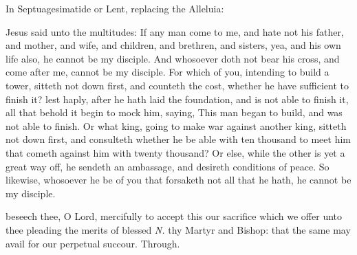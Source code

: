 
\begin{rubric}
{In Septuagesimatide or Lent, replacing the Alleluia:}
\end{rubric}

\vspace{-1ex}


 Jesus said unto the multitudes:  If any man come to me, and hate not his father, and mother, and wife, and children, and brethren, and sisters, yea, and his own life also, he cannot be my disciple. And whosoever doth not bear his cross, and come after me, cannot be my disciple. For which of you, intending to build a tower, sitteth not down first, and counteth the cost, whether he have sufficient to finish it? lest haply, after he hath laid the foundation, and is not able to finish it, all that behold it begin to mock him, saying, This man began to build, and was not able to finish. Or what king, going to make war against another king, sitteth not down first, and consulteth whether he be able with ten thousand to meet him that cometh against him with twenty thousand? Or else, while the other is yet a great way off, he sendeth an ambassage, and desireth conditions of peace. So likewise, whosoever he be of you that forsaketh not all that he hath, he cannot be my disciple.


\vspace{-0.25\baselineskip}

\secret

\vspace{-0.1\baselineskip}

 beseech thee, O Lord, mercifully to accept this our sacrifice which we offer unto thee pleading the merits of blessed \textit{N.} thy Martyr and Bishop: that the same may avail for our perpetual succour. Through.

